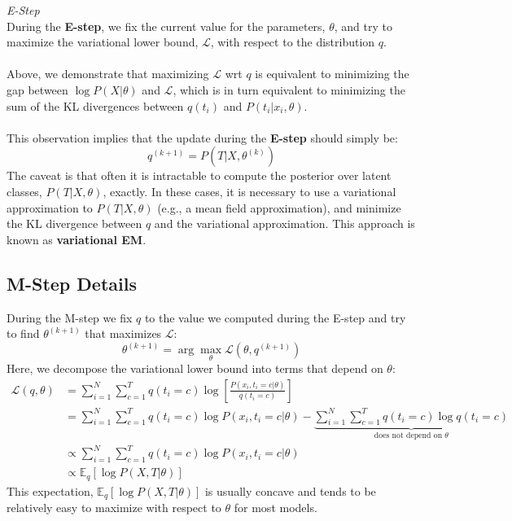 \documentclass[11pt]{article}
\newenvironment{summary}[1][Summary]{
    \begin{trivlist}
    \item[\hskip \labelsep {\bfseries #1}]
}{\end{trivlist}}
\begin{document}
\begin{framed}
    \vspace{-5mm}
    \begin{summary} \textit{E-Step}\\
        During the \textbf{E-step}, we fix the current value for the parameters, $\theta$, and
        try to maximize the variational lower bound, $\mathcal{L}$, with respect to the
        distribution $q$.\\
        \\
        Above, we demonstrate that maximizing $\mathcal{L}$ wrt $q$ is
        equivalent to minimizing the gap between $\log P(X|\theta)$ and
        $\mathcal{L}$, which is in turn equivalent to minimizing the sum of the
        KL divergences between $q(t_i)$ and $P(t_i | x_i, \theta)$.\\
        \\
        This observation implies that the update during the \textbf{E-step}
        should simply be:
        \begin{equation*}
            q^{(k+1)} = P(T | X, \theta^{(k)})
        \end{equation*}
        The caveat is that often it is intractable to compute the posterior
        over latent classes, $P(T | X, \theta)$, exactly. In these cases, it is necessary
        to use a variational approximation to $P(T | X, \theta)$ (e.g.,
        a mean field approximation), and minimize the KL divergence between $q$
        and the variational approximation. This approach is known as \textbf{variational EM}.
    \end{summary}
    \vspace{-2mm}
\end{framed}

\subsection*{M-Step Details}
During the M-step we fix $q$ to the value we computed during the E-step and try
to find $\theta^{(k+1)}$ that maximizes $\mathcal{L}$:
\begin{equation*}
    \theta^{(k+1)} = \arg \max_\theta \mathcal{L}(\theta, q^{(k+1)})
\end{equation*}
Here, we decompose the variational lower bound into terms that depend on
$\theta$:
\begin{align*}
    \mathcal{L}(q, \theta) &= \sum_{i=1}^N \sum_{c=1}^T q(t_i = c) \log \left[
        \frac{P(x_i, t_i = c | \theta)}{q(t_i = c)} \right] \\
    &= \sum_{i=1}^N \sum_{c=1}^T q(t_i = c) \log P(x_i, t_i = c | \theta) -
    \underbrace{\sum_{i=1}^N \sum_{c=1}^T q(t_i = c) \log q(t_i = c)}_{\text{does not depend
    on $\theta$}}\\
    &\propto \sum_{i=1}^N \sum_{c=1}^T q(t_i = c) \log P(x_i, t_i = c |
    \theta)\\
    &\propto \mathbb{E}_q[ \log P(X, T | \theta) ]
\end{align*}
This expectation, $\mathbb{E}_q[ \log P(X, T | \theta) ]$ is usually concave and
tends to be relatively easy to maximize with respect to $\theta$ for most
models.
\end{document}

